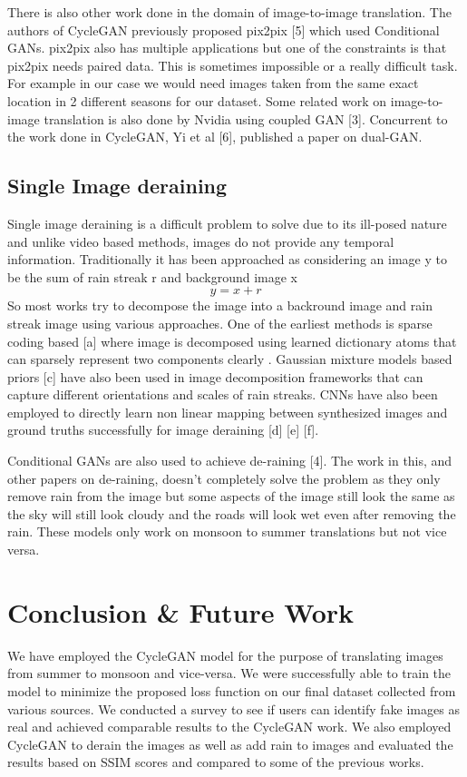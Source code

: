 \documentclass{article}
\begin{document}
There is also other work done in the domain of image-to-image translation. The authors of CycleGAN previously proposed pix2pix [5] which used Conditional GANs. pix2pix also has multiple applications but one of the constraints is that pix2pix needs paired data. This is sometimes impossible or a really difficult task. For example in our case we would need images taken from the same exact location in 2 different seasons for our dataset. Some related work on image-to-image translation is also done by Nvidia using coupled GAN [3]. Concurrent to the work done in CycleGAN, Yi et al [6], published a paper on dual-GAN.

\subsection{Single Image deraining}

Single image deraining is a difficult problem to solve due to its ill-posed nature and unlike video based methods, images do not provide any temporal information. Traditionally it has been approached as considering an image y to be the sum of rain streak r and background image x
$$y = x + r$$
So most works try to decompose the image into a backround image and rain streak image using various approaches. One of the earliest methods is sparse coding based [a] where image is decomposed using learned dictionary atoms that can sparsely represent two components clearly . Gaussian mixture models based priors [c] have also been used in image decomposition frameworks that can capture different orientations and scales of rain streaks. CNNs have also been employed to directly learn non linear mapping between synthesized images and ground truths successfully for image deraining [d] [e] [f].

Conditional GANs are also used to achieve de-raining [4]. The work in this, and other papers on de-raining, doesn’t completely solve the problem as they only remove rain from the image but some aspects of the image still look the same as the sky will still look cloudy and the roads will look wet even after removing the rain. These models only work on monsoon to summer translations but not vice versa.

\section{Conclusion \& Future Work}

We have employed the CycleGAN model for the purpose of translating images from summer to monsoon and vice-versa. We were successfully able to train the model to minimize the proposed loss function on our final dataset collected from various sources. We conducted a survey to see if users can identify fake images as real and achieved comparable results to the CycleGAN work. We also employed CycleGAN to derain the images as well as add rain to images and evaluated the results based on SSIM scores and compared to some of the previous works.
\end{document}
